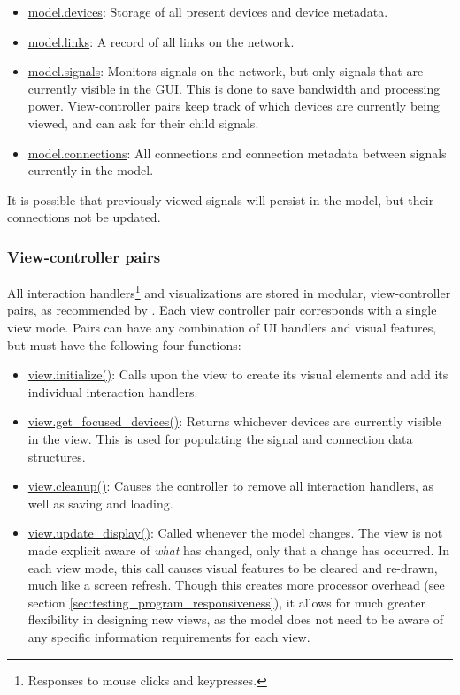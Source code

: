 \begin{itemize}
 	\item \url{model.devices}: Storage of all present devices and device metadata.
 	\item \url{model.links}: A record of all links on the network.
 	\item \url{model.signals}: Monitors signals on the network, but only signals that are currently visible in the GUI. This is done to save bandwidth and processing power. View-controller pairs keep track of which devices are currently being viewed, and can ask for their child signals. 
 	\item \url{model.connections}: All connections and connection metadata between signals currently in the model.
 \end{itemize} 

It is possible that previously viewed signals will persist in the model, but their connections not be updated.

		\subsubsection{View-controller pairs}

All interaction handlers\footnote{Responses to mouse clicks and keypresses.} and visualizations are stored in modular, view-controller pairs, as recommended by . Each view controller pair corresponds with a single view mode. Pairs can have any combination of UI handlers and visual features, but must have the following four functions:

\begin{itemize}
	\item \url{view.initialize()}: Calls upon the view to create its visual elements and add its individual interaction handlers.
	\item \url{view.get_focused_devices()}: Returns whichever devices are currently visible in the view. This is used for populating the signal and connection data structures.
	\item \url{view.cleanup()}: Causes the controller to remove all interaction handlers, as well as saving and loading.
	\item \url{view.update_display()}: Called whenever the model changes. The view is not made explicit aware of \emph{what} has changed, only that a change has occurred. In each view mode, this call causes visual features to be cleared and re-drawn, much like a screen refresh. Though this creates more processor overhead (see section \ref{sec:testing_program_responsiveness}), it allows for much greater flexibility in designing new views, as the model does not need to be aware of any specific information requirements for each view.
\end{itemize}

